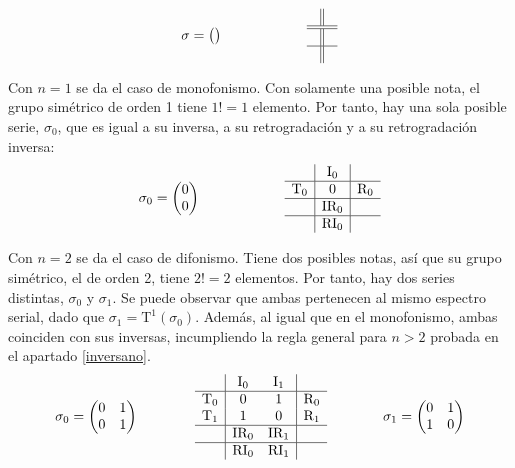 		\[\sigma=\left(\begin{matrix}\\\end{matrix}\right)
		\qquad\qquad\qquad
		\begin{array}{l||r}
		&\\
		\hline
		\hline
		&\\
		\hline
		&
		\end{array}\]
	
		Con $n=1$ se da el caso de monofonismo. Con solamente una posible nota, el grupo simétrico de orden 1 tiene $1!=1$ elemento. Por tanto, hay una sola posible serie, $\sigma_0$, que es igual a su inversa, a su retrogradación y a su retrogradación inversa:
		\[\sigma_0=\left(\begin{matrix}0\\0\end{matrix}\right)
		\qquad\qquad\qquad
		\begin{array}{l|c|r}
			&\text{I}_{0}&\\
			\hline
			\text{T}_{0}&0&\text{R}_{0}\\
			\hline
			&\text{IR}_{0}&\\
			\hline
			&\text{RI}_{0}&
		\end{array}\]
	
		Con $n=2$ se da el caso de difonismo. Tiene dos posibles notas, así que su grupo simétrico, el de orden 2, tiene $2!=2$ elementos. Por tanto, hay dos series distintas, $\sigma_0$ y $\sigma_1$. Se puede observar que ambas pertenecen al mismo espectro serial, dado que $\sigma_1=\text{T}^1(\sigma_0)$. Además, al igual que en el monofonismo, ambas coinciden con sus inversas, incumpliendo la regla general para $n>2$ probada en el apartado \ref{inversano}.
		\[\sigma_0=\left(\begin{matrix}0&1\\0&1\end{matrix}\right)
		\qquad\qquad
		\begin{array}{l|cc|r}
			&\text{I}_{0}&\text{I}_{1}&\\
			\hline
			\text{T}_{0}&0&1&\text{R}_{0}\\
			\text{T}_{1}&1&0&\text{R}_{1}\\
			\hline
			&\text{IR}_{0}&\text{IR}_{1}&\\
			\hline
			&\text{RI}_{0}&\text{RI}_{1}&
		\end{array}
		\qquad\qquad
		\sigma_1=\left(\begin{matrix}0&1\\1&0\end{matrix}\right)\]